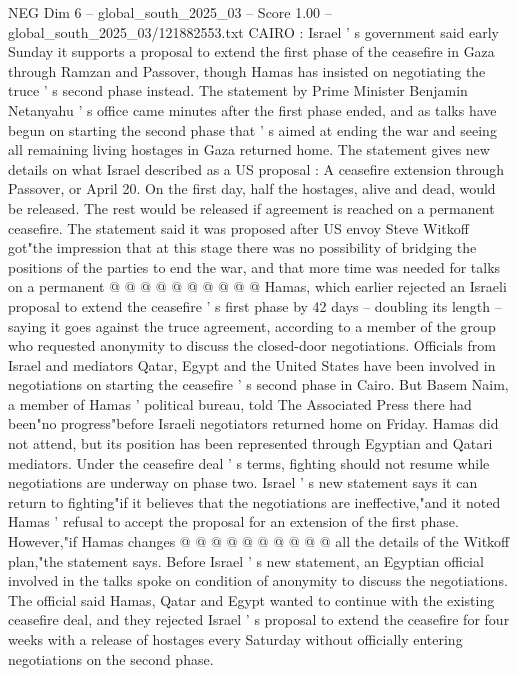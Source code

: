\begin{textsample}{NEG Dim 6 – global\_south\_2025\_03 – Score 1.00 – global\_south\_2025\_03/121882553.txt}  \label{ex:f6_neg_221}
CAIRO : Israel ' s government said early Sunday it supports a proposal to extend the first phase of the ceasefire in Gaza through Ramzan and Passover, though Hamas has insisted on negotiating the truce ' s second phase instead.
The statement by Prime Minister Benjamin Netanyahu ' s office came minutes after the first phase ended, and as talks have begun on starting the second phase that ' s aimed at ending the war and seeing all remaining living hostages in Gaza returned home.
The statement gives new details on what Israel described as a US proposal : A ceasefire extension through Passover, or April 20.
On the first day, half the hostages, alive and dead, would be released.
The rest would be released if agreement is reached on a permanent ceasefire.
The statement said it was proposed after US envoy Steve Witkoff got"the impression that at this stage there was no possibility of bridging the positions of the parties to end the war, and that more time was needed for talks on a permanent @ @ @ @ @ @ @ @ @ @ Hamas, which earlier rejected an Israeli proposal to extend the ceasefire ' s first phase by 42 days -- doubling its length -- saying it goes against the truce agreement, according to a member of the group who requested anonymity to discuss the closed-door negotiations.
Officials from Israel and mediators Qatar, Egypt and the United States have been involved in negotiations on starting the ceasefire ' s second phase in Cairo.
But Basem Naim, a member of Hamas ' political bureau, told The Associated Press there had been"no progress"before Israeli negotiators returned home on Friday.
Hamas did not attend, but its position has been represented through Egyptian and Qatari mediators.
Under the ceasefire deal ' s terms, fighting should not resume while negotiations are underway on phase two.
Israel ' s new statement says it can return to fighting"if it believes that the negotiations are ineffective,"and it noted Hamas ' refusal to accept the proposal for an extension of the first phase.
However,"if Hamas changes @ @ @ @ @ @ @ @ @ @ all the details of the Witkoff plan,"the statement says.
Before Israel ' s new statement, an Egyptian official involved in the talks spoke on condition of anonymity to discuss the negotiations.
The official said Hamas, Qatar and Egypt wanted to continue with the existing ceasefire deal, and they rejected Israel ' s proposal to extend the ceasefire for four weeks with a release of hostages every Saturday without officially entering negotiations on the second phase.

\end{textsample}
